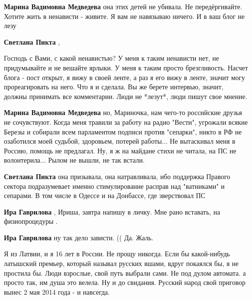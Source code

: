 \begin{itemize}
\begin{itemize}
\textbf{Марина Вадимовна Медведева} она этих детей не убивала. Не передёргивайте. Хотите жить в ненависти - живите. Я вам не навязываю ничего. И в ваш блог не лезу

\textbf{Светлана Пикта} , 

Господь с Вами, с какой ненавистью? У меня к таким ненависти нет, не
придумывайте и не вешайте ярлыки. У меня к таким просто брезгливость. Насчет
блога - пост открыт, я вижу в своей ленте, а раз я его вижу в ленте, значит
могу прореагировать на него. Что я и сделала. Вы же берете интервью, значит,
должны принимать все комментарии. Люди не *лезут*, люди пишут свое мнение.


\textbf{Марина Вадимовна Медведева} но, Мариночка, нам чего-то российские
друзья не сочувствуют. Когда меня травили за работу на радио "Вести", угрожали
всякие Березы и собирали всем парламентом подписи против "сепарки", никто в РФ
не озаботился моей судьбой, здоровьем, потерей работы... Не вытаскивал меня в
Россию, помощь не предлагал. Ну, я ж на майдане стихи не читала, на ПС не
волонтерила... Рылом не вышли, не так встали.

\textbf{Светлана Пикта} она призывала, она натравливала, ибо поддержка Правого сектора подразумевает именно стимулирование расправ над "ватниками" и сепарами. В том числе в Одессе и на Донбассе, где зверствовал ПС

\textbf{Ира Гаврилова} , Ириша, завтра напишу в личку. Мне рано вставать, на физиопроцедуры .

\textbf{Ира Гаврилова} ну так дело зависти. (( Да. Жаль.

\end{itemize} %


Я из Латвии, и я 16 лет в России. Не прощу никогда. Если бы какой-нибудь
латышский премьер, который называл русских вшами, вдруг покаялся бы, я не
простила бы. Люди взрослые, свой путь выбрали сами. Не под дулом автомата. а
просто так, им душа это велела. Ну и до свидания. Русский народ свой приговор
вынес 2 мая 2014 года - и навсегда.

\end{itemize} %

